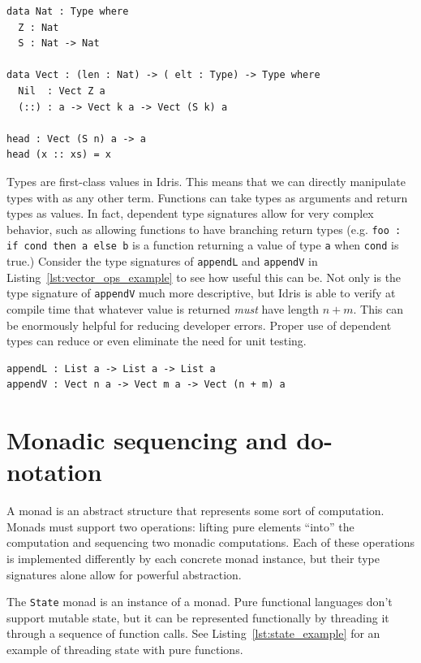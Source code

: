 \documentclass[12pt]{report}
\begin{document}
\begin{lstlisting}[caption={Vect Definition},label={lst:vectdef}]
data Nat : Type where
  Z : Nat
  S : Nat -> Nat

data Vect : (len : Nat) -> ( elt : Type) -> Type where
  Nil  : Vect Z a
  (::) : a -> Vect k a -> Vect (S k) a

head : Vect (S n) a -> a
head (x :: xs) = x
\end{lstlisting}

Types are first-class values in Idris.
This means that we can directly manipulate types with as any other term.
Functions can take types as arguments and return types as values.
In fact, dependent type signatures allow for very complex behavior, such as allowing functions to have branching return types (e.g. \texttt{foo : if cond then a else b} is a function returning a value of type \texttt{a} when \texttt{cond} is true.)
Consider the type signatures of \texttt{appendL} and \texttt{appendV} in Listing~\ref{lst:vector_ops_example} to see how useful this can be.
Not only is the type signature of \texttt{appendV} much more descriptive, but Idris is able to verify at compile time that whatever value is returned \textit{must} have length $n + m$.
This can be enormously helpful for reducing developer errors.
Proper use of dependent types can reduce or even eliminate the need for unit testing.

\begin{lstlisting}[caption={Vector Operations Example},label={lst:vector_ops_example}]
appendL : List a -> List a -> List a
appendV : Vect n a -> Vect m a -> Vect (n + m) a
\end{lstlisting}

\section{Monadic sequencing and do-notation}

A monad is an abstract structure that represents some sort of computation.
Monads must support two operations: lifting pure elements ``into'' the computation and sequencing two monadic computations.
Each of these operations is implemented differently by each concrete monad instance, but their type signatures alone allow for powerful abstraction.

The \texttt{State} monad is an instance of a monad.
Pure functional languages don't support mutable state, but it can be represented functionally by threading it through a sequence of function calls.
See Listing~\ref{lst:state_example} for an example of threading state with pure functions.
\end{document}
